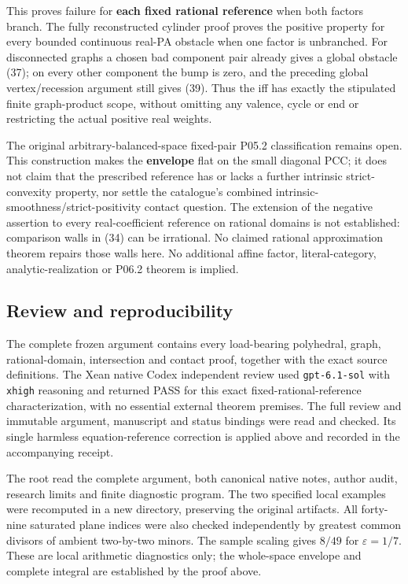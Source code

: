 \documentclass[
  11pt,
]{article}
\begin{document}
This proves failure for \textbf{each fixed rational reference} when both
factors branch. The fully reconstructed cylinder proof proves the
positive property for every bounded continuous real-PA obstacle when one
factor is unbranched. For disconnected graphs a chosen bad component
pair already gives a global obstacle (37); on every other component the
bump is zero, and the preceding global vertex/recession argument still
gives (39). Thus the iff has exactly the stipulated finite graph-product
scope, without omitting any valence, cycle or end or restricting the
actual positive real weights.

The original arbitrary-balanced-space fixed-pair P05.2 classification
remains open. This construction makes the \textbf{envelope} flat on the
small diagonal PCC; it does not claim that the prescribed reference has
or lacks a further intrinsic strict-convexity property, nor settle the
catalogue's combined intrinsic-smoothness/strict-positivity contact
question. The extension of the negative assertion to every
real-coefficient reference on rational domains is not established:
comparison walls in (34) can be irrational. No claimed rational
approximation theorem repairs those walls here. No additional affine
factor, literal-category, analytic-realization or P06.2 theorem is
implied.

\subsection{Review and reproducibility}

The complete frozen argument contains every load-bearing polyhedral,
graph, rational-domain, intersection and contact proof, together with
the exact source definitions. The Xean native Codex independent review
used \texttt{gpt-6.1-sol} with \texttt{xhigh} reasoning and returned PASS
for this exact fixed-rational-reference characterization, with no
essential external theorem premises. The full review and immutable
argument, manuscript and status bindings were read and checked. Its
single harmless equation-reference correction is applied above and
recorded in the accompanying receipt.

The root read the complete argument, both canonical native notes,
author audit, research limits and finite diagnostic program. The two
specified local examples were recomputed in a new directory, preserving
the original artifacts. All forty-nine saturated plane indices were
also checked independently by greatest common divisors of ambient
two-by-two minors. The sample scaling gives \(8/49\) for
\(\varepsilon=1/7\). These are local arithmetic diagnostics only; the
whole-space envelope and complete integral are established by the
proof above.
\end{document}
